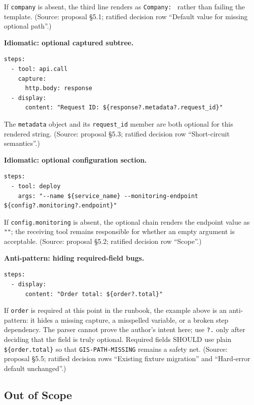 \noindent If \texttt{company} is absent, the third line renders as
\texttt{Company: } rather than failing the template.  (Source: proposal \S5.1;
ratified decision row ``Default value for missing optional path''.)

\noindent\textbf{Idiomatic: optional captured subtree.}

\begin{verbatim}
steps:
  - tool: api.call
    capture:
      http.body: response
  - display:
      content: "Request ID: ${response?.metadata?.request_id}"
\end{verbatim}

\noindent The \texttt{metadata} object and its \texttt{request\_id} member are
both optional for this rendered string.  (Source: proposal \S5.3; ratified
decision row ``Short-circuit semantics''.)

\noindent\textbf{Idiomatic: optional configuration section.}

\begin{verbatim}
steps:
  - tool: deploy
    args: "--name ${service_name} --monitoring-endpoint ${config?.monitoring?.endpoint}"
\end{verbatim}

\noindent If \texttt{config.monitoring} is absent, the optional chain renders
the endpoint value as \texttt{""}; the receiving tool remains responsible for
whether an empty argument is acceptable.  (Source: proposal \S5.2; ratified
decision row ``Scope''.)

\noindent\textbf{Anti-pattern: hiding required-field bugs.}

\begin{verbatim}
steps:
  - display:
      content: "Order total: ${order?.total}"
\end{verbatim}

\noindent If \texttt{order} is required at this point in the runbook, the
example above is an anti-pattern: it hides a missing capture, a misspelled
variable, or a broken step dependency.  The parser cannot prove the author's
intent here; use \texttt{?.} only after deciding that the field is truly
optional.  Required fields SHOULD use plain \texttt{\$\{order.total\}} so that
\texttt{GIS-PATH-MISSING} remains a safety net.  (Source: proposal \S5.5;
ratified decision rows ``Existing fixture migration'' and ``Hard-error default
unchanged''.)

\subsection{Out of Scope}
\label{subsec:gis:optional-chaining:out-of-scope}

